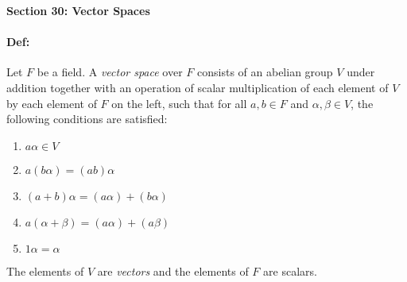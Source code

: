 \documentclass[10pt,a4paper]{article}
\begin{document}
\begin{center}
\textbf{Section 30: Vector Spaces}
\end{center}

\paragraph{Def:} Let $F$ be a field. A \textit{vector space} over $F$ consists of an abelian group $V$ under addition together with an operation of scalar multiplication of each element of $V$ by each element of $F$ on the left, such that for all $a,b \in F$ and $\alpha, \beta \in V$, the following conditions are satisfied:
\begin{enumerate}
\item $a\alpha \in V$
\item $a(b\alpha) = (ab)\alpha$
\item $(a+b)\alpha = (a\alpha)+(b\alpha)$
\item $a(\alpha + \beta) = (a\alpha) + (a\beta)$
\item $1 \alpha = \alpha$
\end{enumerate}

The elements of $V$ are \textit{vectors} and the elements of $F$ are scalars.
\end{document}
